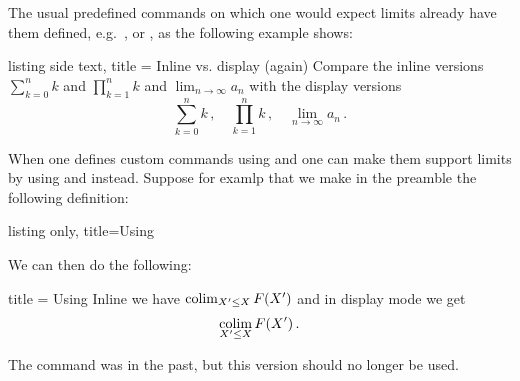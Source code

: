 \documentclass[a4paper, 10pt, headings=standardclasses, oneside, bibliography=totocnumbered]{scrbook}
\begin{document}
The usual predefined commands on which one would expect limits already have them defined, e.g.\ ,  or , as the following example shows:
\begin{tcblisting}{listing side text, title = {Inline vs. display (again)}}
Compare the inline versions $\sum_{k=0}^n k$ and $\prod_{k=1}^n k$ and $\lim_{n \to \infty} a_n$ with the display versions
\[
  \sum_{k=0}^n k \,,
  \quad
  \prod_{k=1}^n k \,,
  \quad
  \lim_{n \to \infty} a_n \,.
\]
\end{tcblisting}
When one defines custom commands using  and  one can make them support limits by using  and  instead.
Suppose for examlp that we make in the preamble the following definition:
\begin{tcblisting}{listing only, title={Using }}
\DeclareMathOperator*{\colim}{colim}
\end{tcblisting}
We can then do the following:
\begin{tcblisting}{title = {Using }}
Inline we have $\colim_{X' \leq X} F(X')$ and in display mode we get
\[
  \colim_{X' \leq X} F(X') \,.
\]
\end{tcblisting}
The command  was  in the past, but this version should no longer be used.
\end{document}
